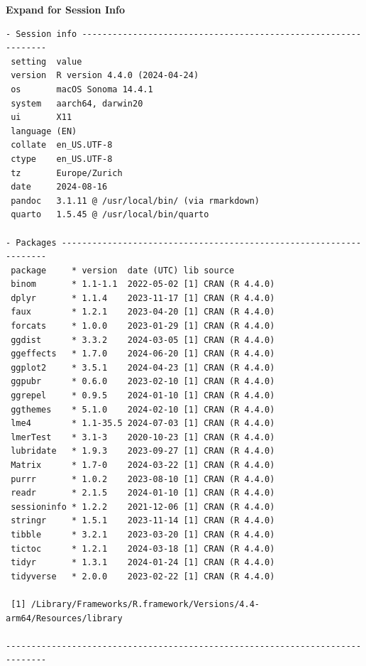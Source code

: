 \documentclass[
  letterpaper,
  DIV=11,
  numbers=noendperiod]{scrartcl}
\begin{document}
\begin{tcolorbox}[enhanced jigsaw, leftrule=.75mm, colframe=quarto-callout-note-color-frame, bottomrule=.15mm, opacityback=0, arc=.35mm, left=2mm, rightrule=.15mm, breakable, colback=white, toprule=.15mm]
\begin{minipage}[t]{5.5mm}
\textcolor{quarto-callout-note-color}{\faInfo}
\end{minipage}%
\begin{minipage}[t]{\textwidth - 5.5mm}

\vspace{-3mm}\textbf{Expand for Session Info}\vspace{3mm}

\begin{verbatim}
- Session info ---------------------------------------------------------------
 setting  value
 version  R version 4.4.0 (2024-04-24)
 os       macOS Sonoma 14.4.1
 system   aarch64, darwin20
 ui       X11
 language (EN)
 collate  en_US.UTF-8
 ctype    en_US.UTF-8
 tz       Europe/Zurich
 date     2024-08-16
 pandoc   3.1.11 @ /usr/local/bin/ (via rmarkdown)
 quarto   1.5.45 @ /usr/local/bin/quarto

- Packages -------------------------------------------------------------------
 package     * version  date (UTC) lib source
 binom       * 1.1-1.1  2022-05-02 [1] CRAN (R 4.4.0)
 dplyr       * 1.1.4    2023-11-17 [1] CRAN (R 4.4.0)
 faux        * 1.2.1    2023-04-20 [1] CRAN (R 4.4.0)
 forcats     * 1.0.0    2023-01-29 [1] CRAN (R 4.4.0)
 ggdist      * 3.3.2    2024-03-05 [1] CRAN (R 4.4.0)
 ggeffects   * 1.7.0    2024-06-20 [1] CRAN (R 4.4.0)
 ggplot2     * 3.5.1    2024-04-23 [1] CRAN (R 4.4.0)
 ggpubr      * 0.6.0    2023-02-10 [1] CRAN (R 4.4.0)
 ggrepel     * 0.9.5    2024-01-10 [1] CRAN (R 4.4.0)
 ggthemes    * 5.1.0    2024-02-10 [1] CRAN (R 4.4.0)
 lme4        * 1.1-35.5 2024-07-03 [1] CRAN (R 4.4.0)
 lmerTest    * 3.1-3    2020-10-23 [1] CRAN (R 4.4.0)
 lubridate   * 1.9.3    2023-09-27 [1] CRAN (R 4.4.0)
 Matrix      * 1.7-0    2024-03-22 [1] CRAN (R 4.4.0)
 purrr       * 1.0.2    2023-08-10 [1] CRAN (R 4.4.0)
 readr       * 2.1.5    2024-01-10 [1] CRAN (R 4.4.0)
 sessioninfo * 1.2.2    2021-12-06 [1] CRAN (R 4.4.0)
 stringr     * 1.5.1    2023-11-14 [1] CRAN (R 4.4.0)
 tibble      * 3.2.1    2023-03-20 [1] CRAN (R 4.4.0)
 tictoc      * 1.2.1    2024-03-18 [1] CRAN (R 4.4.0)
 tidyr       * 1.3.1    2024-01-24 [1] CRAN (R 4.4.0)
 tidyverse   * 2.0.0    2023-02-22 [1] CRAN (R 4.4.0)

 [1] /Library/Frameworks/R.framework/Versions/4.4-arm64/Resources/library

------------------------------------------------------------------------------
\end{verbatim}

\end{minipage}%
\end{tcolorbox}
\end{document}
